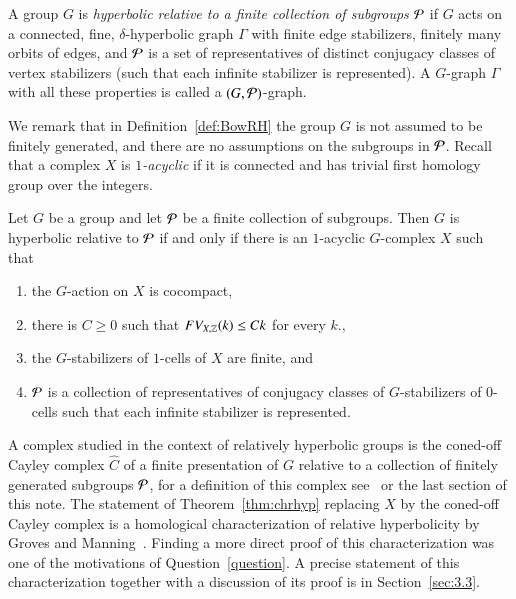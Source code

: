 \begin{definition}\label{def:BowRH}\cite{Bo12}
A group $G$ is \emph{hyperbolic relative to a finite collection of subgroups $\mathcal P$} if
$G$ acts   on a connected, fine, $\delta$-hyperbolic graph $\Gamma$ with finite edge stabilizers, finitely many orbits of edges,  and $\mathcal P$ is a set of representatives of distinct conjugacy classes of vertex stabilizers (such that each infinite stabilizer is represented).   A $G$-graph $\Gamma$ with all these properties is called a $(G, \mathcal P)$-graph.  
\end{definition}

We remark that in Definition~\ref{def:BowRH} the group $G$ is not assumed to be finitely generated, and there are no assumptions on the subgroups in  $\mathcal P$.  Recall that a complex $X$ is \emph{$1$-acyclic} if it is connected and has trivial first homology group over the integers.  
 
\begin{theorem}\label{thm:chrhyp}
Let $G$ be a group and let $\mathcal P$ be a finite collection of subgroups.  Then $G$ is hyperbolic relative to $\mathcal P$ if and only if there is an $1$-acyclic $G$-complex $X$ such that
\begin{enumerate}
\item the $G$-action on $X$ is cocompact,
\item there is $C\geq 0$ such that  $FV_{X, \mathbb{Z}}(k)\leq Ck$ for every $k$., 
\item the $G$-stabilizers of $1$-cells of $X$ are finite, and 
\item $\mathcal P$ is a collection of representatives of conjugacy classes of $G$-stabilizers of $0$-cells  such that each infinite stabilizer is represented. 
\end{enumerate}
\end{theorem}



A complex studied in the context of relatively hyperbolic groups is the coned-off Cayley complex $\widehat C$ of a finite presentation of $G$ relative to a collection of finitely generated subgroups $\mathcal P$, for a definition of this complex see~\cite[Definition 2.47]{GrMa09} or the last section of this note. The statement of Theorem~\ref{thm:chrhyp} replacing $X$ by the coned-off Cayley complex is a homological characterization of relative hyperbolicity by Groves and Manning~\cite[Theorem 3.25]{GrMa09}. Finding a more direct proof of this characterization was one of the motivations of Question~\ref{question}.  A  precise statement  of this  characterization together with a discussion of its proof is in Section~\ref{sec:3.3}.  

